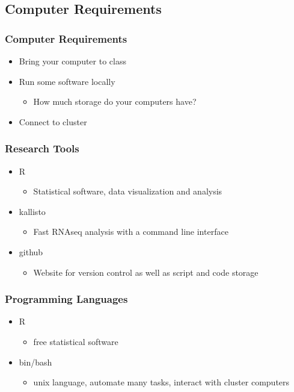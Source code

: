 \documentclass{beamer}
\begin{document}
\subsection{Computer Requirements}
\begin{frame}
\frametitle{Computer Requirements}
\begin{itemize}
	\item Bring your computer to class
	\item Run some software locally
	\begin{itemize}
		\item How much storage do your computers have?
	\end{itemize}
	\item Connect to cluster
\end{itemize}
\end{frame}
\begin{frame}
\frametitle{Research Tools}
\begin{itemize}
	\item<1-> R
	\begin{itemize}
	\item<1-> Statistical software, data visualization and analysis
	\end{itemize}
	\item<2-> kallisto
	\begin{itemize}
	\item<2-> Fast RNAseq analysis with a command line interface
	\end{itemize}	
	\item<3-> github
	\begin{itemize}
	\item<3-> Website for version control as well as script and code storage
	\end{itemize}
\end{itemize}
\end{frame}
\begin{frame}
\frametitle{Programming Languages}
\begin{itemize}
	\item R
	\begin{itemize}
		\item free statistical software
	\end{itemize}
	\item bin/bash
	\begin{itemize}
		\item unix language, automate many tasks, interact with cluster computers
	\end{itemize}
\end{itemize}
\end{frame}
\end{document}
